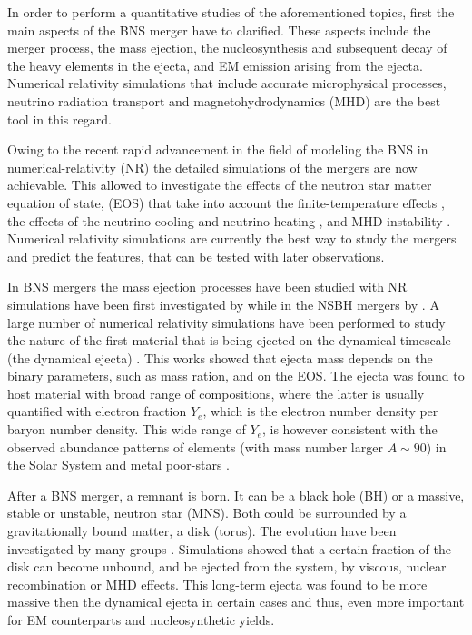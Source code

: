 In order to perform a quantitative studies of the aforementioned topics, first the main aspects 
of the BNS merger have to clarified. These aspects include the merger process, the mass ejection, 
the nucleosynthesis and subsequent decay of the heavy elements in the ejecta, and EM emission
arising from the ejecta. Numerical relativity simulations that include accurate microphysical processes, 
neutrino radiation transport and magnetohydrodynamics (MHD) are the best tool in this regard. 

Owing to the recent rapid advancement in the field of modeling the BNS in numerical-relativity (NR) 
the detailed simulations of the mergers are now achievable.
This allowed to investigate the effects of the neutron star matter equation of state, (EOS) that 
take into account the finite-temperature effects \citep{Duez:2009yz,Sekiguchi:2011zd},
the effects of the neutrino cooling \citep{Sekiguchi:2011zd,Deaton:2013sla,Foucart:2014nda,Palenzuela:2015dqa} and neutrino heating \citep{Sekiguchi:2015dma,Foucart:2016rxm}, and
MHD instability \citep{Kiuchi:2014hja,Kiuchi:2015sga,Kiuchi:2015sga}.
Numerical relativity simulations are currently the best way to study the mergers and predict the features, 
that can be tested with later observations.

In BNS mergers the mass ejection processes have been studied with NR simulations have been first 
investigated by \citet{Hotokezaka:2013b} while in the NSBH mergers by \citet{Foucart:2012vn}. A large number of numerical relativity 
simulations have been performed to study the nature of the first material that is being ejected 
on the dynamical timescale (the dynamical ejecta) \citep{Sekiguchi:2015dma,Palenzuela:2015dqa,Lovelace:2013vma,Kyutoku:2013wxa,Foucart:2015vpa,Foucart:2015gaa,Foucart:2016rxm,Sekiguchi:2016bjd,Lehner:2016lxy,Radice:2016dwd,Foucart:2016vxd,Kyutoku:2017voj,Dietrich:2018uni,Dietrich:2016lyp,Bovard:2017mvn,Radice:2018pdn}. This works showed that ejecta mass depends on the binary parameters, such as mass ration, and on 
the EOS. The ejecta was found to host material with broad range of compositions, where the latter 
is usually quantified with electron fraction $Y_e$, which is the electron number density per baryon 
number density. This wide range of $Y_e$, is however consistent with the observed abundance patterns 
of \rproc{} elements (with mass number larger $A\sim90$) in the Solar System and metal poor-stars \citep{Wanajo:2014wha,Radice:2016dwd}.

After a BNS merger, a remnant is born. It can be a black hole (BH) or a massive, stable or unstable, neutron star (MNS). Both could be surrounded by a gravitationally bound matter, a disk (torus). 
The \pmerg{} evolution have been investigated by many groups \citep{Fernandez:2013tya,Metzger:2014ila,Perego:2014fma,Fernandez:2014cna,Just:2014fka,Fernandez:2016sbf,Siegel:2017nub,Fujibayashi:2017xsz,Fernandez:2018kax}. 
Simulations showed that a certain fraction of the disk can become unbound, and be ejected from the system, 
by viscous, nuclear recombination or MHD effects. 
This long-term ejecta was found to be more massive then the dynamical ejecta in certain cases and thus,
even more important for EM counterparts and nucleosynthetic yields.


